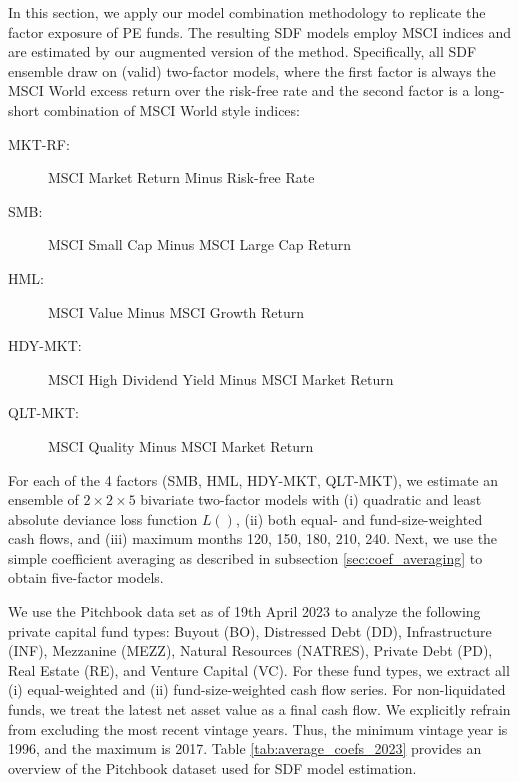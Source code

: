\documentclass[12pt]{article}
\begin{document}
In this section, we apply our model combination methodology to replicate the factor exposure of PE funds.
The resulting SDF models employ MSCI indices and are estimated by our augmented version of the \cite{DLP12} method.
Specifically, all SDF ensemble draw on (valid) two-factor models, where the first factor is always the MSCI World excess return over the risk-free rate and the second factor is a long-short combination of MSCI World style indices:
\begin{description}
	\item[MKT-RF:]{MSCI Market Return Minus Risk-free Rate}
	\item[SMB:]{MSCI Small Cap Minus MSCI Large Cap Return}
	\item[HML:]{MSCI Value Minus MSCI Growth Return}
	\item[HDY-MKT:]{MSCI High Dividend Yield Minus MSCI Market Return}
	\item[QLT-MKT:]{MSCI Quality Minus MSCI Market Return}
\end{description}
For each of the 4 factors (SMB, HML, HDY-MKT, QLT-MKT), we estimate an ensemble of $2 \times 2 \times 5$ bivariate two-factor models with (i) quadratic and least absolute deviance loss function $L()$, (ii) both equal- and fund-size-weighted cash flows, and (iii) maximum months 120, 150, 180, 210, 240.
Next, we use the simple coefficient averaging as described in subsection \ref{sec:coef_averaging} to obtain five-factor models.

We use the Pitchbook data set as of 19th April 2023 to analyze the following private capital fund types: 
Buyout (BO), 
Distressed Debt (DD), 
Infrastructure (INF), 
Mezzanine (MEZZ),
Natural Resources (NATRES), 
Private Debt (PD), 
Real Estate (RE), 
and Venture Capital (VC).
For these fund types, we extract all (i) equal-weighted and (ii) fund-size-weighted cash flow series.
For non-liquidated funds, we treat the latest net asset value as a final cash flow.
We explicitly refrain from excluding the most recent vintage years.
Thus, the minimum vintage year is 1996, and the maximum is 2017.
Table \ref{tab:average_coefs_2023} provides an overview of the Pitchbook dataset used for SDF model estimation.
\end{document}
